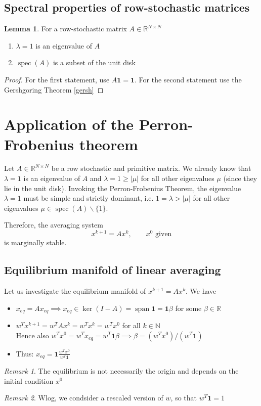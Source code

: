 \documentclass{book}
\DeclareMathOperator{\spec}{spec}
\DeclareMathOperator{\vspan}{span}
\newcommand{\R}{\mathbb{R}}
\newcommand{\N}{\mathbb{N}}
\theoremstyle{theoremv2}
\theoremstyle{defv2}
\theoremstyle{remark}
\newtheorem*{remark}{Remark}
\theoremstyle{remark}
\theoremstyle{definition}
\newtheorem*{lemma}{Lemma}
\theoremstyle{definition}
\begin{document}
\subsection{Spectral properties of row-stochastic matrices}
\begin{lemma}
    For a row-stochastic matrix $A\in\R^{N\times N}$
    \begin{enumerate}
        \item $\lambda = 1$ is an eigenvalue of $A$
        \item $\spec(A)$ is a subset of the unit disk
    \end{enumerate}
\end{lemma}
\begin{proof}[Proof]
    For the first statement, use $A\boldsymbol{1} = \boldsymbol{1}$. For the second statement use the Gershgoring Theorem \ref{gersh}
\end{proof}
\section{Application of the Perron-Frobenius theorem}
Let $A\in\R^{N\times N}$ be a row stochastic and primitive matrix. We already know that $\lambda=1$ is an eigenvalue of $A$ and $\lambda=1\geq |\mu|$ for all other eigenvalues $\mu$ (since they lie in the unit disk). Invoking the Perron-Frobenius Theorem, the eigenvalue $\lambda=1$ must be simple and strictly dominant, i.e. $1=\lambda>|\mu|$ for all other eigenvalues $\mu\in\spec(A)\backslash \{1\}$.

Therefore, the averaging system 
\[
    x^{k+1} = A x^k,\qquad x^0 \text{ given}
\]
is marginally stable. 
\subsection{Equilibrium manifold of linear averaging}
Let us investigate the equilibrium manifold of $x^{k+1} = Ax^k$. We have 
\begin{itemize}
    \item $x_{eq} = Ax_{eq} \implies x_{eq}\in\ker(I-A) = \vspan \boldsymbol{1} = \boldsymbol{1}\beta$ for some $\beta\in\R$
    \item $w^Tx^{k+1} = w^T Ax^k = w^Tx^k = w^Tx^0$ for all $k\in\N$
        \\ Hence also $w^Tx^0=w^Tx_{eq}=w^T\boldsymbol{1}\beta\implies \beta = (w^Tx^0)/(w^T\boldsymbol{1})$
    \item Thus: $x_{eq} = \boldsymbol{1} \displaystyle\frac{w^Tx^0}{w^T\boldsymbol{1}}$
\end{itemize}
\begin{remark}
    The equilibrium is not necessarily the origin and depends on the initial condition $x^0$
\end{remark}
\begin{remark}
    Wlog, we condsider a rescaled version of $w$, so that $w^T\boldsymbol{1}=1$
\end{remark}
\end{document}
